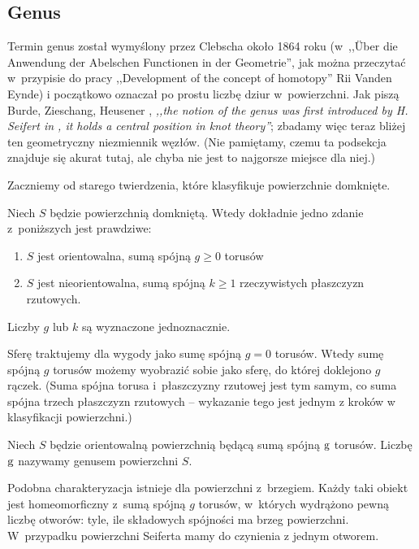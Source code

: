 %

\subsection{Genus}
%
Termin genus został wymyślony przez Clebscha około 1864 roku (w~,,Über die Anwendung der Abelschen Functionen in der Geometrie'', jak można przeczytać w~przypisie do pracy ,,Development of the concept of homotopy'' Rii Vanden Eynde) i początkowo oznaczał po prostu liczbę dziur w~powierzchni.
Jak piszą Burde, Zieschang, Heusener \cite[s. 20]{burde2014}, \emph{,,the notion of the genus was first introduced by H. Seifert in \cite{seifert1935}, it holds a central position in knot theory''}; zbadamy więc teraz bliżej ten geometryczny niezmiennik węzłów.
(Nie pamiętamy, czemu ta podsekcja znajduje się akurat tutaj, ale chyba nie jest to najgorsze miejsce dla niej.)

Zaczniemy od starego twierdzenia, które klasyfikuje powierzchnie domknięte.

\begin{proposition}
    Niech $S$ będzie powierzchnią domkniętą.
    Wtedy dokładnie jedno zdanie z~poniższych jest prawdziwe:
    \begin{enumerate}[leftmargin=*]
        \itemsep0em
        \item $S$ jest orientowalna, sumą spójną $g \ge 0$ torusów
        \item $S$ jest nieorientowalna, sumą spójną $k \ge 1$ rzeczywistych płaszczyzn rzutowych.
    \end{enumerate}
    Liczby $g$ lub $k$ są wyznaczone jednoznacznie. %
\end{proposition}

Sferę traktujemy dla wygody jako sumę spójną $g = 0$ torusów.
Wtedy sumę spójną $g$ torusów możemy wyobrazić sobie jako sferę, do której doklejono $g$ rączek.
(Suma spójna torusa i~płaszczyzny rzutowej jest tym samym, co suma spójna trzech płaszczyzn rzutowych -- wykazanie tego jest jednym z kroków w klasyfikacji powierzchni.)

\begin{definition}
    Niech $S$ będzie orientowalną powierzchnią będącą sumą spójną $\operatorname{g}$ torusów.
    Liczbę $\operatorname{g}$ nazywamy genusem powierzchni $S$.
\end{definition}

Podobna charakteryzacja istnieje dla powierzchni z~brzegiem.
Każdy taki obiekt jest homeomorficzny z~sumą spójną $g$ torusów, w~których wydrążono pewną liczbę otworów: tyle, ile składowych spójności ma brzeg powierzchni.
W~przypadku powierzchni Seiferta mamy do czynienia z jednym otworem.

